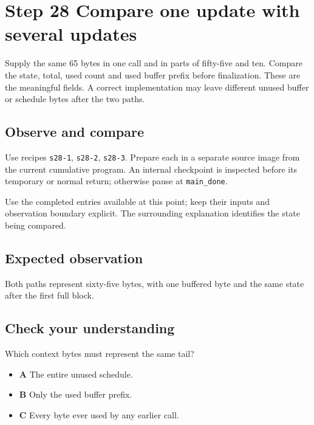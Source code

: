 \section{Step 28 Compare one update with several updates}\label{sha-s28}

Supply the same 65 bytes in one call and in parts of fifty-five and ten. Compare the state, total, used count and used buffer prefix before finalization. These are the meaningful fields. A correct implementation may leave different unused buffer or schedule bytes after the two paths.

\subsection{Observe and compare}
Use recipes \texttt{s28-1}, \texttt{s28-2}, \texttt{s28-3}. Prepare each in a separate source image from the current cumulative program. An internal checkpoint is inspected before its temporary or normal return; otherwise pause at \texttt{main\_done}.

Use the completed entries available at this point; keep their inputs and observation boundary explicit. The surrounding explanation identifies the state being compared.

\subsection{Expected observation}
Both paths represent sixty-five bytes, with one buffered byte and the same state after the first full block.

\subsection{Check your understanding}
Which context bytes must represent the same tail?

\begin{itemize}
  \item \textbf{A} The entire unused schedule.
  \item \textbf{B} Only the used buffer prefix.
  \item \textbf{C} Every byte ever used by any earlier call.
\end{itemize}

